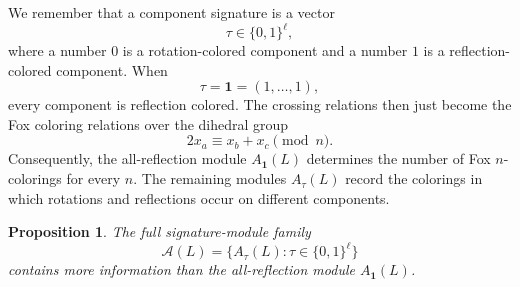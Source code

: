 \documentclass[11pt]{article}
\newtheorem{proposition}[theorem]{Proposition}
\theoremstyle{definition}
\begin{document}
We remember that a component signature is a vector
\[
\tau\in\{0,1\}^\ell,
\]
where a number $0$ is a rotation-colored component and a number $1$ is a reflection-colored component. When
\[
\tau=\mathbf{1}=(1,\ldots,1),
\]
every component is reflection colored. The crossing relations then just become the Fox coloring relations over the dihedral group~\cite[Section~2.1]{kauffman}
\[
2x_a\equiv x_b+x_c\pmod n.
\]
Consequently, the all-reflection module $A_{\mathbf{1}}(L)$ determines the number of Fox $n$-colorings for every $n$. The remaining modules $A_\tau(L)$ record the colorings in which rotations and reflections occur on different components.

\begin{proposition}
The full signature-module family
\[
\mathcal{A}(L)=\{A_\tau(L):\tau\in\{0,1\}^\ell\}
\]
contains more information than the all-reflection module $A_{\mathbf{1}}(L)$.
\end{proposition}
\end{document}
